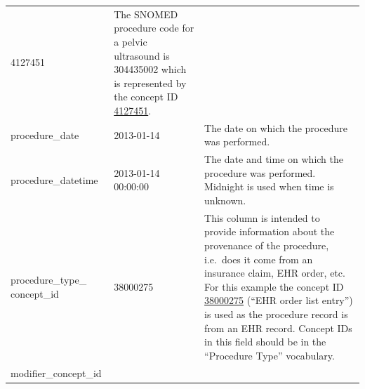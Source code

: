 \documentclass[11pt]{book}
\theoremstyle{definition}
\theoremstyle{definition}
\theoremstyle{definition}
\theoremstyle{remark}
\begin{document}
\begin{longtable}[]{@{}lll@{}}
\begin{minipage}[t]{0.15\columnwidth}
4127451\strut
\end{minipage} & \begin{minipage}[t]{0.49\columnwidth}\raggedright
The SNOMED procedure code for a pelvic ultrasound is 304435002 which is represented by the concept ID \href{http://athena.ohdsi.org/search-terms/terms/4127451}{4127451}.\strut
\end{minipage}\tabularnewline
\begin{minipage}[t]{0.28\columnwidth}\raggedright
procedure\_date\strut
\end{minipage} & \begin{minipage}[t]{0.15\columnwidth}\raggedright
2013-01-14\strut
\end{minipage} & \begin{minipage}[t]{0.49\columnwidth}\raggedright
The date on which the procedure was performed.\strut
\end{minipage}\tabularnewline
\begin{minipage}[t]{0.28\columnwidth}\raggedright
procedure\_datetime\strut
\end{minipage} & \begin{minipage}[t]{0.15\columnwidth}\raggedright
2013-01-14 00:00:00\strut
\end{minipage} & \begin{minipage}[t]{0.49\columnwidth}\raggedright
The date and time on which the procedure was performed. Midnight is used when time is unknown.\strut
\end{minipage}\tabularnewline
\begin{minipage}[t]{0.28\columnwidth}\raggedright
procedure\_type\_ concept\_id\strut
\end{minipage} & \begin{minipage}[t]{0.15\columnwidth}\raggedright
38000275\strut
\end{minipage} & \begin{minipage}[t]{0.49\columnwidth}\raggedright
This column is intended to provide information about the provenance of the procedure, i.e.~does it come from an insurance claim, EHR order, etc. For this example the concept ID \href{http://athena.ohdsi.org/search-terms/terms/38000275}{38000275} (``EHR order list entry'') is used as the procedure record is from an EHR record. Concept IDs in this field should be in the ``Procedure Type'' vocabulary.\strut
\end{minipage}\tabularnewline
\begin{minipage}[t]{0.28\columnwidth}\raggedright
modifier\_concept\_id\strut
\end{minipage} & \begin{minipage}[t]{0.15\columnwidth}\raggedright

\end{minipage}
\end{longtable}
\end{document}
